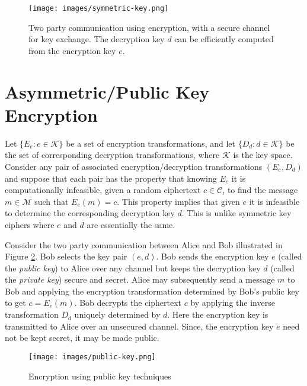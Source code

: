 	\begin{figure}[h!]
	 	\centering
	 	\texttt{[image: images/symmetric-key.png]}
	 	\caption{Two party communication using encryption, with a secure channel for key exchange. The decryption key $d$ can be efficiently computed from the encryption key $e$. }
	 	\label{fig:symmetric-key}
	 \end{figure} 

\section{Asymmetric/Public Key Encryption}
	Let $\{E_{e}: e \in \mathcal{K}\}$ be a set of encryption transformations, and let $\{D_{d}: d \in \mathcal{K}\}$ be the set of corresponding decryption transformations, where $\mathcal{K}$ is the key space.
	Consider any pair of associated encryption/decryption transformations $(E_{e},D_{d})$ and suppose that each pair has the property that knowing $E_{e}$ it is computationally infeasible, given a random ciphertext $c \in \mathcal{C}$, to find the message $m \in \mathcal{M}$ such that $E_{e}(m) = c$.
	This property implies that given $e$ it is infeasible to determine the corresponding decryption key $d$.
	This is unlike symmetric key ciphers where $e$ and $d$ are essentially the same\cite{menezes2010handbook}.

	Consider the two party communication between Alice and Bob illustrated in Figure \ref{fig:public-key}. 
	Bob selects the key pair $(e, d)$. 
	Bob sends the encryption key $e$ (called the \textit{public key}) to Alice over any channel but keeps the decryption key $d$ (called the \textit{private key}) secure and secret.
	Alice may subsequently send a message $m$ to Bob and applying the encryption transformation determined by Bob's public key to get $c = E_{e}(m)$.
	Bob decrypts the ciphertext $c$ by applying the inverse transformation $D_{d}$ uniquely determined by $d$.
	Here the encryption key is transmitted to Alice over an unsecured channel.
	Since, the encryption key $e$ need not be kept secret, it may be made public.
	\begin{figure}[h!]
		\centering
		\texttt{[image: images/public-key.png]}
		\caption{Encryption using public key techniques}
		\label{fig:public-key}
	\end{figure}

